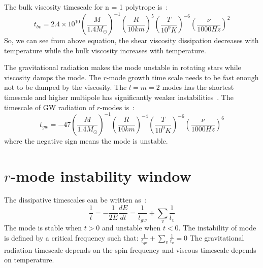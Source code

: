 \documentclass{ttuthes2007}
\begin{document}
The bulk viscosity timescale for n = 1 polytrope is~\cite{ANDERSSON_2001}:
\begin{equation}
t_{bv}=2.4 \times 10^{10}
\left(\frac{M}{1.4M_\odot}\right)^{-1}\left(\frac{R}{10km}\right)^5\left(\frac{T}{10^9K}\right)^{-6}\left(\frac{\nu}{1000 Hz}\right)^2
\end{equation}
So, we can see from above equation, the shear viscosity dissipation decreases
with temperature while the bulk viscosity increases with temperature.

The gravitational radiation makes the mode unstable in rotating stars while
viscosity damps the mode. The $r$-mode growth time scale needs to be fast enough not to be damped by the
viscosity. The $l=m=2$ modes has the shortest timescale and higher multipole has
significantly weaker instabilities~\cite{ANDERSSON_2001}. The timescale of
\ac{GW} radiation of $r$-modes is~\cite{ANDERSSON_2001}:
\begin{equation}
t_{gw}=-47                                                       
\left(\frac{M}{1.4M_\odot}\right)^{-1}\left(\frac{R}{10km}\right)^{-4} \left(\frac{T}{10^9K}\right)^{-6}\left(\frac{\nu}{1000
Hz}\right)^6
\end{equation}
where the negative sign means the mode is unstable.

\section{$r$-mode instability window}
The dissipative timescales can be written as~\cite{Owen_2000}:
\begin{equation}
\frac{1}{t}=-\frac{1}{2E}\frac{dE}{dt}=\frac{1}{t_{gw}}+\sum_v \frac{1}{t_v}
\end{equation}
The mode is stable when $t>0$ and unstable when $t<0$. 
The instability of mode is defined by a critical frequency such that:
$\frac{1}{t_{gw}}+\sum_v \frac{1}{t_v}= 0$
The gravitational radiation timescale depends on the spin frequency and viscous
timescale depends on temperature. 
\end{document}
